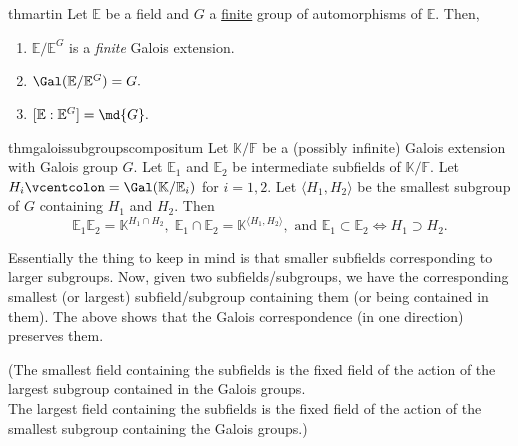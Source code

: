 \begin{restatable}{thm}{artin}
\label{thm:artin}
    Let $\mathbb{E}$ be a field and $G$ a \underline{finite} group of automorphisms of $\mathbb{E}.$ Then,
    \begin{enumerate}
         \item $\mathbb{E}/\mathbb{E}^G$ is a \emph{finite} Galois extension.
         \item $\Gal(\mathbb{E}/\mathbb{E}^G) = G.$
         \item $[\mathbb{E} : \mathbb{E}^G] = \md{G}.$ \hfill\hyperref[thm:artin2]{\downsym}
     \end{enumerate} 
\end{restatable}

\begin{restatable}[]{thm}{galoissubgroupscompositum}
\label{thm:galoissubgroupscompositum}
    Let $\mathbb{K}/\mathbb{F}$ be a {\color{purple}(possibly infinite)} Galois extension with Galois group $G.$ Let $\mathbb{E}_1$ and $\mathbb{E}_2$ be intermediate subfields of $\mathbb{K}/\mathbb{F}.$ Let $H_i \vcentcolon= \Gal(\mathbb{K}/\mathbb{E}_i)$ for $i = 1, 2.$ Let $\langle H_1, H_2\rangle$ be the smallest subgroup of $G$ containing $H_1$ and $H_2.$ Then
    \begin{equation*} 
        \mathbb{E}_1\mathbb{E}_2 = \mathbb{K}^{H_1 \cap H_2},\; \mathbb{E}_1 \cap \mathbb{E}_2 = \mathbb{K}^{\langle H_1, H_2\rangle}, \text{ and } \mathbb{E}_1 \subset \mathbb{E}_2 \iff H_1 \supset H_2.
    \end{equation*} \hfill\hyperref[thm:galoissubgroupscompositum2]{\downsym}
\end{restatable}

\begin{rem}
    Essentially the thing to keep in mind is that smaller subfields corresponding to larger subgroups. Now, given two subfields/subgroups, we have the corresponding smallest (or largest) subfield/subgroup containing them (or being contained in them). The above shows that the Galois correspondence (in one direction) preserves them.

    (The smallest field containing the subfields is the fixed field of the action of the largest subgroup contained in the Galois groups.\\
    The largest field containing the subfields is the fixed field of the action of the smallest subgroup containing the Galois groups.)
\end{rem}

